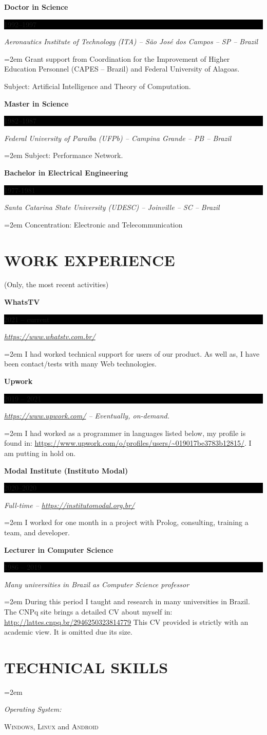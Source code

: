 \documentclass[paper=a4,fontsize=11pt]{scrartcl} %
\newlength{\spacebox}
\newcommand{\sepspace}{\vspace*{0.8em}}		%
\newcommand{\NewPart}[1]{\section*{\uppercase{#1}}}
\newcommand{\PersonalEntry}[2]{
		\noindent\hangindent=2em\hangafter=0 %
		\parbox{\spacebox}{        %
		\textit{#1}}		       %
		\hspace{1.5em} #2 \par}    %
\newcommand{\SkillsEntry}[2]{      %
		\noindent\hangindent=2em\hangafter=0 %
		\parbox{\spacebox}{        %
		\textit{#1}}			   %
		\hspace{1.5em} #2 \par}    %
\newcommand{\EducationEntry}[4]{
		\noindent \textbf{#1} \hfill      %
		\colorbox{Black}{%
			\parbox{6em}{%
			\hfill\color{White}#2}} \par  %
		\noindent \textit{#3} \par        %
		\noindent\hangindent=2em\hangafter=0 \small #4 %
		\normalsize \par}
\begin{document}
\EducationEntry{Doctor in Science}{1992--1997}{Aeronautics Institute of Technology (ITA) -- São José dos Campos -- SP -- Brazil}{Grant support from  Coordination for the Improvement of Higher Education Personnel (CAPES -- Brazil) and Federal University of Alagoas.} {Subject: Artificial Intelligence and Theory of Computation.}
\sepspace

\EducationEntry{Master in Science}{1982--1987}{Federal University of Paraíba (UFPb) -- Campina Grande -- PB -- Brazil}{Subject: Performance Network.}
\sepspace

\EducationEntry{Bachelor in Electrical Engineering}{1977-1981}{Santa Catarina State University (UDESC) -- Joinville -- SC -- Brazil}{Concentration: Electronic and Telecommunication}
\NewPart{Work experience}(Only, the most recent activities)%

\EducationEntry{WhatsTV} {2021 -- current}{\url{https://www.whatstv.com.br/}}{I had worked technical support for users of our product. As well as, I have been contact/tests with many Web technologies.}
\sepspace

\EducationEntry{Upwork} {2019 -- 2021}{\url{https://www.upwork.com/} -- Eventually,  on-demand.}{I had worked as a programmer in languages listed below, my profile is found in: \url{https://www.upwork.com/o/profiles/users/~019017be3783b12815/}. I am putting in hold on.}
\sepspace

\EducationEntry{Modal Institute (Instituto Modal)} {2020--2020}{Full-time -- \url{https://institutomodal.org.br/}}
{I worked for one month in a project with Prolog, consulting, training a team, and developer.}
\sepspace

\EducationEntry{Lecturer in Computer Science} {1986 -- 2019}{Many universities in Brazil as Computer Science professor}{During this period I taught and research in many universities in Brazil. The CNPq site brings a detailed CV about myself in: \underline{\url{http://lattes.cnpq.br/2946250323814779}}  This CV provided is strictly with an academic view. It is omitted due its size.}


\NewPart{Technical Skills}{}

\SkillsEntry{Operating System:} {\textsc{Windows}, \textsc{Linux}  and  \textsc{Android}} 
\end{document}
